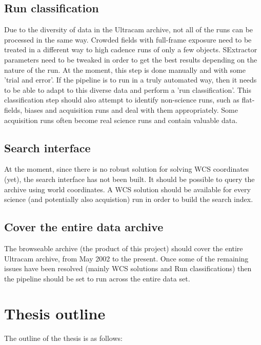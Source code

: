 \documentclass[a4paper,10pt]{article}
\begin{document}
\subsection{Run classification}
Due to the diversity of data in the Ultracam archive, not all of the runs can be processed in the same way. Crowded fields with full-frame exposure need to be treated in a different way to high cadence runs of only a few objects. SExtractor parameters need to be tweaked in order to get the best results depending on the nature of the run. At the moment, this step is done manually and with some 'trial and error'. If the pipeline is to run in a truly automated way, then it needs to be able to adapt to this diverse data and perform a 'run classification'. This classification step should also attempt to identify non-science runs, such as flat-fields, biases and acquisition runs and deal with them appropriately. Some acquisition runs often become real science runs and contain valuable data. 

\subsection{Search interface}
At the moment, since there is no robust solution for solving WCS coordinates (yet), the search interface has not been built. It should be possible to query the archive using world coordinates. A WCS solution should be available for every science (and potentially also acquistion) run in order to build the search index.

\subsection{Cover the entire data archive} 
The browseable archive (the product of this project) should cover the entire Ultracam archive, from May 2002 to the present. Once some of the remaining issues have been resolved (mainly WCS solutions and Run classifications) then the pipeline should be set to run across the entire data set. 

\section{Thesis outline}

The outline of the thesis is as follows:
\end{document}
